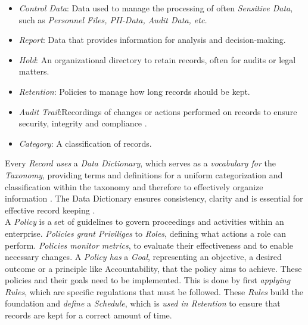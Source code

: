 \documentclass[
  a4paper,  %
  twoside,  %
  bibliography=totoc,
  headsepline,
  cleardoublepage=empty,
  parskip=half,
  draft=false
]{scrbook}
\begin{document}
\begin{itemize}
    \item \textit{Control Data}: Data used to manage the processing of often \textit{Sensitive Data}, such as \textit{Personnel Files, PII-Data, Audit Data, etc.}
    \item \textit{Report}: Data that provides information for analysis and decision-making. 
    \item \textit{Hold}: An organizational directory to retain records, often for audits or legal matters.
    \item \textit{Retention}: Policies to manage how long records should be kept.
    \item \textit{Audit Trail}:Recordings of changes or actions performed on records to ensure security, integrity and compliance \cite{Bjork1975Generalized}. 
    \item \textit{Category}: A classification of records. 
\end{itemize}

Every \textit{Record uses} a \textit{Data Dictionary}, which serves as a \textit{vocabulary for} the \textit{Taxonomy}, providing terms and definitions for a uniform categorization and classification within the taxonomy and therefore to effectively organize information \cite{Milne2007Taxonomy}. The Data Dictionary ensures consistency, clarity and is essential for effective record keeping \cite{Blethyn2008Data}.  \\

A \textit{Policy} is a set of guidelines to govern proceedings and activities within an enterprise. \textit{Policies grant Priviliges} to \textit{Roles}, defining what actions a role can perform.  \textit{Policies monitor metrics}, to evaluate their effectiveness and to enable necessary changes. A \textit{Policy has} a \textit{Goal}, representing an objective, a desired outcome or a principle like Accountability, that the policy aims to achieve. These policies and their goals need to be implemented. This is done by first \textit{applying Rules}, which are specific regulations that must be followed. These \textit{Rules} build the foundation and \textit{define} a \textit{Schedule}, which is \textit{used in Retention} to ensure that records are kept for a correct amount of time.
\end{document}
